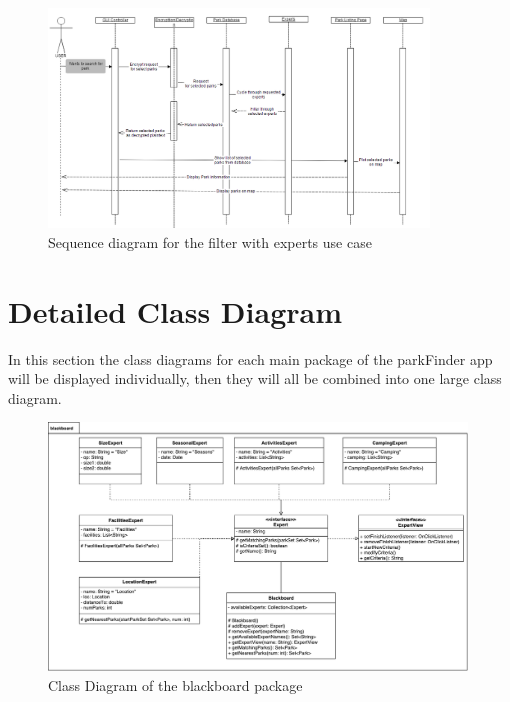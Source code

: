 \documentclass[titlepage,12pt]{article}
\begin{document}
\begin{figure}[H]
	\centerline{\includegraphics[width=0.90\textwidth]{sequence_diagrams/SpecifyExperts}}
	\caption{Sequence diagram for the filter with experts use case}
	\label{fig:SD4}
\end{figure}



\section{Detailed Class Diagram}
\label{sec:detailed_class_diagram}
In this section the class diagrams for each main package of the parkFinder app will be displayed
individually, then they will all be combined into one large class diagram.

\begin{figure}[H]
    \centerline{\includegraphics[width=0.99\textwidth]{class_diagrams/blackboard_ClassDiagram}}
    \caption{Class Diagram of the blackboard package}
    \label{fig:blackboard_classDiagram}
\end{figure}
\end{document}
